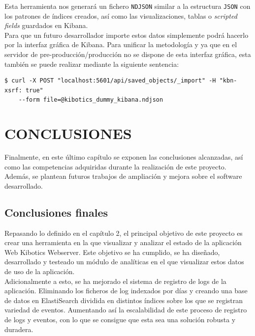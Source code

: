 \documentclass[11pt,a4paper]{book}
\begin{document}
			Esta herramienta nos generará un fichero \texttt{NDJSON} similar a la estructura \texttt{JSON} con los patrones de índices creados, así como las visualizaciones, tablas o \textit{scripted fields} guardados en Kibana.\\
			
			Para que un futuro desarrollador importe estos datos simplemente podrá hacerlo por la interfaz gráfica de Kibana. Para unificar la metodología y ya que en el servidor de pre-producción/producción no se dispone de esta interfaz gráfica, esta también se puede realizar mediante la siguiente sentencia:\\
			

			
			\begin{Verbatim}[tabsize=4]
$ curl -X POST "localhost:5601/api/saved_objects/_import" -H "kbn-xsrf: true" 
	--form file=@kibotics_dummy_kibana.ndjson
			\end{Verbatim}
			
			


	\chapter{CONCLUSIONES}
		Finalmente, en este último capítulo se exponen las conclusiones alcanzadas, así como las competencias adquiridas durante la realización de este proyecto. Además, se plantean futuros trabajos de ampliación y mejora sobre el software desarrollado.
		\section{Conclusiones finales}
			Repasando lo definido en el capítulo 2, el principal objetivo de este proyecto es crear una herramienta en la que visualizar y analizar el estado de la aplicación Web Kibotics Webserver. Este objetivo se ha cumplido, se ha diseñado, desarrollado y testeado un módulo de analíticas en el que visualizar estos datos de uso de la aplicación.\\
			
			Adicionalmente a esto, se ha mejorado el sistema de registro de logs de la aplicación. Eliminando los ficheros de log indexados por días y creando una base de datos en ElastiSearch dividida en distintos índices sobre los que se registran variedad de eventos. Aumentando así la escalabilidad de este proceso de registro de logs y eventos, con lo que se consigue que esta sea una solución robusta y duradera.
\end{document}

